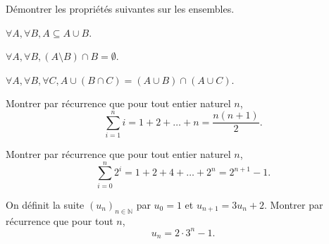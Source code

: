 
\begingroup

\begin{exercice}\label{exo:introduction/maths/revision}

  Démontrer les propriétés suivantes sur les ensembles. 
  \begin{questions}
  \item $\forall A, \forall B, A \subseteq A \cup B$.
  \item $\forall A, \forall B, (A \setminus B) \cap B = \emptyset$.
  \item $\forall A, \forall B, \forall C, A \cup (B \cap C) = (A \cup B) \cap (A \cup C)$.
  \item Montrer par récurrence que pour tout entier naturel $n$, 
    $$
    \sum_{i=1}^n i = 1 + 2 + \dots + n = \frac{n(n+1)}{2}.
    $$
  \item Montrer par récurrence que pour tout entier naturel $n$,
    $$
    \sum_{i=0}^n 2^i = 1 + 2 + 4 + \dots + 2^n = 2^{n+1} - 1.
    $$
  \item On définit la suite $(u_n)_{n\in\mathbb{N}}$ par $u_0 = 1$ et $u_{n+1} = 3u_n + 2$.
    Montrer par récurrence que pour tout $n$,
    $$
    u_n = 2 \cdot 3^n - 1.
    $$
  \end{questions}
  
\end{exercice}

